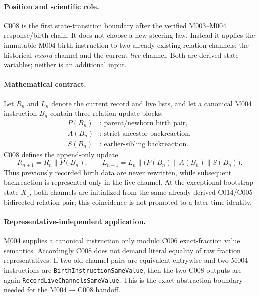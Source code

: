 
\paragraph*{Position and scientific role.}
C008 is the first state-transition boundary after the verified M003--M004
response/birth chain.  It does not choose a new steering law.  Instead it
applies the immutable M004 birth instruction to two already-existing relation
channels: the historical \emph{record} channel and the current \emph{live}
channel.  Both are derived state variables; neither is an additional input.

\paragraph*{Mathematical contract.}
Let $R_n$ and $L_n$ denote the current record and live lists, and let a canonical
M004 instruction $B_n$ contain three relation-update blocks:
\[
\begin{aligned}
  P(B_n) &:\ \text{parent/newborn birth pair},\\
  A(B_n) &:\ \text{strict-ancestor backreaction},\\
  S(B_n) &:\ \text{earlier-sibling backreaction}.
\end{aligned}
\]
C008 defines the append-only update
\[
  \boxed{R_{n+1}=R_n\mathbin{\|}P(B_n)},
  \qquad
  \boxed{L_{n+1}=L_n\mathbin{\|}
    \bigl(P(B_n)\mathbin{\|}A(B_n)\mathbin{\|}S(B_n)\bigr)}.
\]
Thus previously recorded birth data are never rewritten, while subsequent
backreaction is represented only in the live channel.  At the exceptional
bootstrap state $X_1$, both channels are initialized from the same already
derived C014/C005 bidirected relation pair; this coincidence is not promoted to
a later-time identity.

\paragraph*{Representative-independent application.}
M004 supplies a canonical instruction only modulo C006 exact-fraction value
semantics.  Accordingly C008 does not demand literal equality of raw fraction
representatives.  If two old channel pairs are equivalent entrywise and two
M004 instructions are \texttt{BirthInstructionSameValue}, then the two C008
outputs are again \texttt{RecordLiveChannelsSameValue}.  This is the exact
abstraction boundary needed for the M004$\to$C008 handoff.

